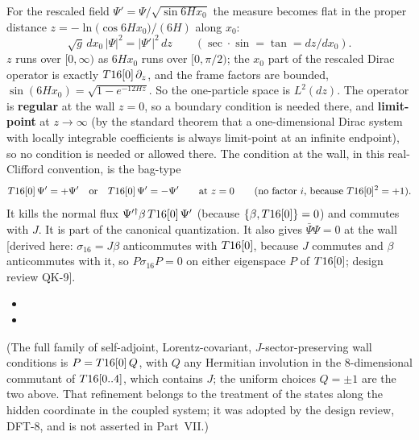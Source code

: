 For the rescaled field $\Psi'=\Psi/\sqrt{\sin 6Hx_0}$ the measure becomes flat in the proper distance
$z=-\ln\bigl(\cos 6Hx_0\bigr)/(6H)$ along $x_0$:
\[
  \sqrt g\,dx_0\,|\Psi|^2=|\Psi'|^2\,dz\qquad(\sec\cdot\sin=\tan=dz/dx_0).
\]
$z$ runs over $[0,\infty)$ as $6Hx_0$ runs over $[0,\pi/2)$; the $x_0$ part of the rescaled Dirac
operator is exactly $T16[0]\,\partial_z$, and the frame factors are bounded,
$\sin(6Hx_0)=\sqrt{1-e^{-12Hz}}$. So the one-particle space is $L^2(dz)$. The operator is
\textbf{regular} at the wall $z=0$, so a boundary condition is needed there, and
\textbf{limit-point} at $z\to\infty$ (by the standard theorem that a one-dimensional Dirac system with
locally integrable coefficients is always limit-point at an infinite endpoint), so no condition is
needed or allowed there. The condition at the wall, in this real-Clifford convention, is the
bag-type
\[
  T16[0]\,\Psi'=+\Psi'\quad\text{or}\quad T16[0]\,\Psi'=-\Psi'\qquad\text{at } z=0
  \qquad(\text{no factor } i\text{, because } T16[0]^2=+1).
\]
It kills the normal flux $\Psi'^{\dagger}\beta\,T16[0]\,\Psi'$ (because $\{\beta,T16[0]\}=0$) and
commutes with $J$. It is part of the canonical quantization.  It also gives
$\bar\Psi\Psi=0$ at the wall [derived here: $\sigma_{16}=J\beta$ anticommutes with $T16[0]$, because
$J$ commutes and $\beta$ anticommutes with it, so $P\sigma_{16}P=0$ on either eigenspace $P$ of
$T16[0]$; design review QK-9].
\begin{itemize}
  \item {}
  \item {}
\end{itemize}
(The full family of self-adjoint, Lorentz-covariant, $J$-sector-preserving wall conditions is
$P=T16[0]\,Q$, with $Q$ any Hermitian involution in the 8-dimensional commutant of $T16[0..4]$,
which contains $J$; the uniform choices $Q=\pm1$ are the two above. That refinement belongs to the
treatment of the states along the hidden coordinate in the coupled system; it was adopted by the
design review, DFT-8, and is not asserted in Part~VII.)

